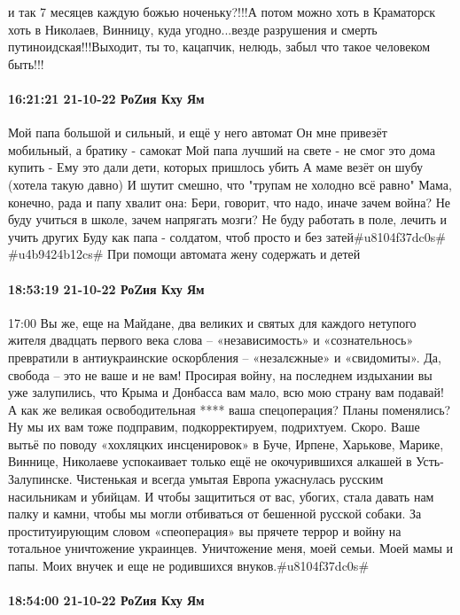 и так 7 месяцев каждую божью ноченьку?!!!А потом можно хоть в Краматорск хоть в
Николаев, Винницу, куда угодно...везде разрушения и смерть
путиноидская!!!Выходит, ты то, кацапчик, нелюдь, забыл что такое человеком
быть!!!

\paragraph{16:21:21 21-10-22 РоZия Кху Ям}

Мой папа большой и сильный, и ещё у него автомат
Он мне привезёт мобильный, а братику - самокат
Мой папа лучший на свете - не смог это дома купить -
Ему это дали дети, которых пришлось убить
А маме везёт он шубу (хотела такую давно)
И шутит смешно, что "трупам не холодно всё равно"
Мама, конечно, рада и папу хвалит она:
Бери, говорит, что надо, иначе зачем война?
Не буду учиться в школе, зачем напрягать мозги?
Не буду работать в поле, лечить и учить других
Буду как папа - солдатом, чтоб просто и без затей#u8104f37dc0s# #u4b9424b12cs#
При помощи автомата жену содержать и детей

\paragraph{18:53:19 21-10-22 РоZия Кху Ям}
17:00
Вы же, еще на Майдане, два великих и святых для каждого нетупого жителя двадцать первого века слова – «независимость» и «сознательнось» превратили в антиукраинские оскорбления – «незалєжные» и «свидомиты». Да, свобода – это не ваше и не вам!
Просирая войну, на последнем издыхании вы уже залупились, что Крыма и Донбасса вам мало, всю мою страну вам подавай! А как же великая освободительная **** ваша спецоперация? Планы поменялись? Ну мы их вам тоже подправим, подкорректируем, подрихтуем. Скоро.
Ваше вытьё по поводу «хохляцких инсценировок» в Буче, Ирпене, Харькове, Марике, Виннице, Николаеве успокаивает только ещё не окочурившихся алкашей в Усть-Залупинске. Чистенькая и всегда умытая Европа ужаснулась русским насильникам и убийцам. И чтобы защититься от вас, убогих, стала давать нам палку и камни, чтобы мы могли отбиваться от бешенной русской собаки.
За проституирующим словом «спеоперация» вы прячете террор и войну на тотальное уничтожение украинцев. Уничтожение меня, моей семьи. Моей мамы и папы. Моих внучек и еще не родившихся внуков.#u8104f37dc0s#

\paragraph{18:54:00 21-10-22 РоZия Кху Ям}

